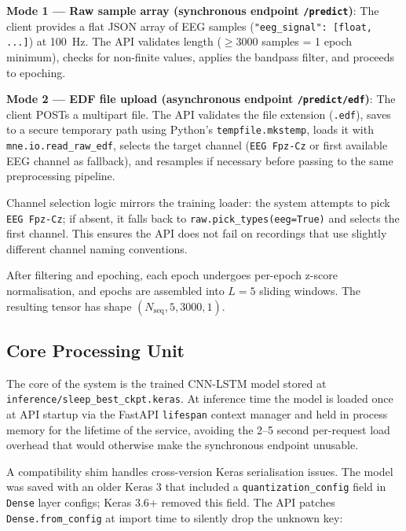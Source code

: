 \documentclass[10pt]{article}
\begin{document}
\textbf{Mode 1 --- Raw sample array (synchronous endpoint \texttt{/predict})}: The client provides a flat JSON array of EEG samples (\texttt{"eeg\_signal": [float, ...]}) at 100~Hz. The API validates length ($\geq 3000$ samples = 1 epoch minimum), checks for non-finite values, applies the bandpass filter, and proceeds to epoching.

\textbf{Mode 2 --- EDF file upload (asynchronous endpoint \texttt{/predict/edf})}: The client POSTs a multipart file. The API validates the file extension (\texttt{.edf}), saves to a secure temporary path using Python's \texttt{tempfile.mkstemp}, loads it with \texttt{mne.io.read\_raw\_edf}, selects the target channel (\texttt{EEG Fpz-Cz} or first available EEG channel as fallback), and resamples if necessary before passing to the same preprocessing pipeline.

Channel selection logic mirrors the training loader: the system attempts to pick \texttt{EEG Fpz-Cz}; if absent, it falls back to \texttt{raw.pick\_types(eeg=True)} and selects the first channel. This ensures the API does not fail on recordings that use slightly different channel naming conventions.

After filtering and epoching, each epoch undergoes per-epoch z-score normalisation, and epochs are assembled into $L=5$ sliding windows. The resulting tensor has shape $(N_{\text{seq}}, 5, 3000, 1)$.

\subsection{Core Processing Unit}
\label{sec:coreLayer}

The core of the system is the trained CNN-LSTM model stored at \texttt{inference/sleep\_best\_ckpt.keras}. At inference time the model is loaded once at API startup via the FastAPI \texttt{lifespan} context manager and held in process memory for the lifetime of the service, avoiding the 2--5 second per-request load overhead that would otherwise make the synchronous endpoint unusable.

A compatibility shim handles cross-version Keras serialisation issues. The model was saved with an older Keras 3 that included a \texttt{quantization\_config} field in \texttt{Dense} layer configs; Keras 3.6+ removed this field. The API patches \texttt{Dense.from\_config} at import time to silently drop the unknown key:
\end{document}

